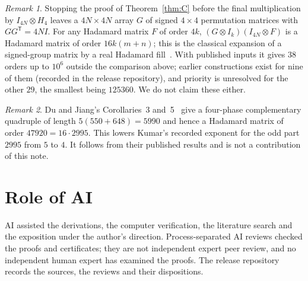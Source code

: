 \documentclass[10pt]{article}
\theoremstyle{remark}
\newtheorem*{remark}{Remark}
\newcommand{\tr}{^{\mathsf T}}
\begin{document}
\begin{remark}
Stopping the proof of Theorem~\ref{thm:C} before the final multiplication by $I_{4N}\otimes H_4$ leaves a $4N\times4N$ array $G$ of signed $4\times4$ permutation matrices with $GG\tr=4NI$. For any Hadamard matrix $F$ of order $4k$, $(G\otimes I_k)(I_{4N}\otimes F)$ is a Hadamard matrix of order $16k(m+n)$; this is the classical expansion of a signed-group matrix by a real Hadamard fill~\cite{Cr95}. With published inputs it gives $38$ orders up to $10^6$ outside the comparison above; earlier constructions exist for nine of them (recorded in the release repository), and priority is unresolved for the other $29$, the smallest being $125360$. We do not claim these either.
\end{remark}

\begin{remark}
Du and Jiang's Corollaries~3 and~5~\cite{DJ24} give a four-phase complementary quadruple of length $5(550+648)=5990$ and hence a Hadamard matrix of order $47920=16\cdot2995$. This lowers Kumar's recorded exponent for the odd part $2995$ from $5$ to $4$. It follows from their published results and is not a contribution of this note.
\end{remark}

\section{Role of AI}\label{sec:ai}
AI assisted the derivations, the computer verification, the literature search and the exposition under the author's direction. Process-separated AI reviews checked the proofs and certificates; they are not independent expert peer review, and no independent human expert has examined the proofs. The release repository records the sources, the reviews and their dispositions.
\end{document}
